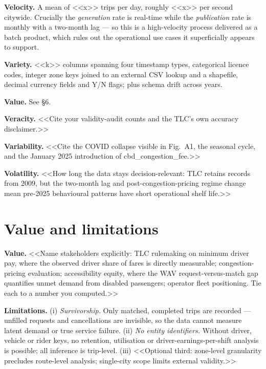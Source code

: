 \documentclass[10pt,a4paper]{article}
\begin{document}
\textbf{Velocity.} A mean of <<x>> trips per day, roughly <<x>> per second
citywide. Crucially the \emph{generation} rate is real-time while the
\emph{publication} rate is monthly with a two-month lag --- so this is a
high-velocity process delivered as a batch product, which rules out the
operational use cases it superficially appears to support.

\textbf{Variety.} <<k>> columns spanning four timestamp types, categorical
licence codes, integer zone keys joined to an external CSV lookup and a
shapefile, decimal currency fields and Y/N flags; plus schema drift across
years.

\textbf{Value.} See \S6.

\textbf{Veracity.} <<Cite your validity-audit counts and the TLC's own accuracy
disclaimer.>>

\textbf{Variability.} <<Cite the COVID collapse visible in Fig.~A1, the seasonal
cycle, and the January 2025 introduction of cbd\_congestion\_fee.>>

\textbf{Volatility.} <<How long the data stays decision-relevant: TLC retains
records from 2009, but the two-month lag and post-congestion-pricing regime
change mean pre-2025 behavioural patterns have short operational shelf life.>>

\section{Value and limitations}

\textbf{Value.} <<Name stakeholders explicitly: TLC rulemaking on minimum driver
pay, where the observed driver share of fares is directly measurable;
congestion-pricing evaluation; accessibility equity, where the WAV
request-versus-match gap quantifies unmet demand from disabled passengers;
operator fleet positioning. Tie each to a number you computed.>>

\textbf{Limitations.} (i) \emph{Survivorship.} Only matched, completed trips are
recorded --- unfilled requests and cancellations are invisible, so the data
cannot measure latent demand or true service failure. (ii) \emph{No entity
identifiers.} Without driver, vehicle or rider keys, no retention, utilisation
or driver-earnings-per-shift analysis is possible; all inference is
trip-level. (iii) <<Optional third: zone-level granularity precludes
route-level analysis; single-city scope limits external validity.>>
\end{document}
